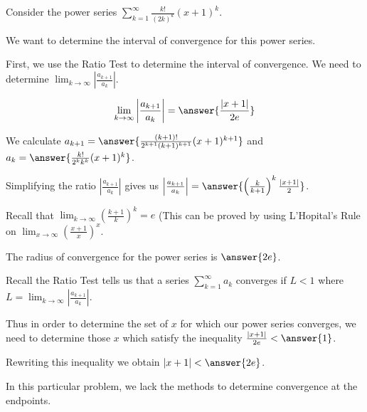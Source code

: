 \documentclass{ximera}
\author{Jim Talamo}
\begin{document}
\begin{exercise}
Consider the power series $\sum_{k=1}^{\infty} \frac{k!  }{(2k)^k}(x+1)^{k}$.

We want to determine the interval of convergence for this power series. 




\begin{exercise}

First, we use the Ratio Test to determine the interval of convergence. 
We need to determine $\lim_{k \to \infty}\left| \frac{a_{k+1}}{a_k} \right|$. 

\[
\lim_{k \to \infty}\left|\frac{ a_{k+1}}{a_k}\right| =\answer{\frac{|x+1|}{2e}}
\]


\begin{hint}
We calculate $a_{k+1}=\answer{\frac{ (k+1)!}{2^{k+1} (k+1)^{k+1}}(x+1)^{k+1}}$ and $a_k=\answer{ \frac{k!}{2^k k^k}(x+1)^k    }$. 

Simplifying the ratio $\left|\frac{a_{k+1}}{a_k}\right|$ gives us $\left|\frac{a_{k+1}}{a_k}\right|=\answer{ \left( \frac{k}{k+1} \right)^k \frac{ |x+1|}{2}    }$. 

Recall that $\lim_{k \to \infty} \left( \frac{ k+1}{k} \right)^k=e$ 
(This can be proved by using L'Hopital's Rule on $\lim_{x \to \infty} \left( \frac{x+1}{x} \right)^{x}$. 


\end{hint}





\begin{exercise}

The radius of convergence for the power series is $\answer{2e}$.


\begin{hint}

Recall the Ratio Test tells us that a series $\sum^{\infty}_{k=1} a_k$ converges if $L <1$ where $L=\lim_{k \to \infty}\left| \frac{a_{k+1}}{a_k}\right|$. 

Thus in order to determine the set of $x$ for which our power series converges, we need to determine those $x$ which satisfy 
the inequality $\frac{|x+1|}{2e} <\answer{1}$. 

Rewriting this inequality we obtain $|x+1|< \answer{2e}$. 


\end{hint}


\begin{exercise}

In this particular problem, we lack the methods to determine convergence at the endpoints.


\end{exercise}
\end{exercise}
\end{exercise}
\end{exercise}
\end{document}
